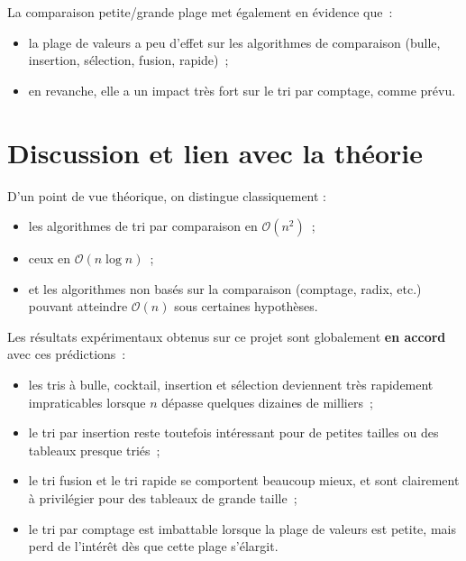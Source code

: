 \documentclass[11pt,a4paper]{article}
\begin{document}
La comparaison petite/grande plage met également en évidence que~:

\begin{itemize}
  \item la plage de valeurs a peu d'effet sur les algorithmes de
        comparaison (bulle, insertion, sélection, fusion, rapide)~;
  \item en revanche, elle a un impact très fort sur le tri par
        comptage, comme prévu.
\end{itemize}

\section{Discussion et lien avec la théorie}

D'un point de vue théorique, on distingue classiquement :

\begin{itemize}
  \item les algorithmes de tri par comparaison en $\mathcal{O}(n^2)$~;
  \item ceux en $\mathcal{O}(n \log n)$~;
  \item et les algorithmes non basés sur la comparaison (comptage,
        radix, etc.) pouvant atteindre $\mathcal{O}(n)$ sous certaines
        hypothèses.
\end{itemize}

Les résultats expérimentaux obtenus sur ce projet sont globalement
\textbf{en accord} avec ces prédictions~:

\begin{itemize}
  \item les tris à bulle, cocktail, insertion et sélection deviennent
        très rapidement impraticables lorsque $n$ dépasse quelques
        dizaines de milliers~;
  \item le tri par insertion reste toutefois intéressant pour de
        petites tailles ou des tableaux presque triés~;
  \item le tri fusion et le tri rapide se comportent beaucoup mieux, et
        sont clairement à privilégier pour des tableaux de grande
        taille~;
  \item le tri par comptage est imbattable lorsque la plage de valeurs
        est petite, mais perd de l'intérêt dès que cette plage
        s'élargit.
\end{itemize}
\end{document}
